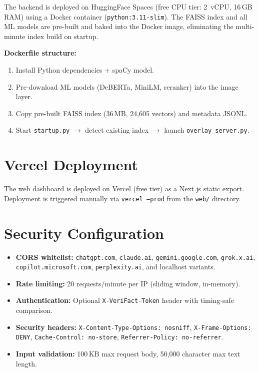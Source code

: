 \documentclass[12pt, a4paper, oneside]{report}
\begin{document}
The backend is deployed on HuggingFace Spaces (free CPU tier: 2~vCPU, 16\,GB RAM) using a Docker container (\texttt{python:3.11-slim}). The FAISS index and all ML models are pre-built and baked into the Docker image, eliminating the multi-minute index build on startup.

\textbf{Dockerfile structure:}
\begin{enumerate}[nosep]
    \item Install Python dependencies + spaCy model.
    \item Pre-download ML models (DeBERTa, MiniLM, reranker) into the image layer.
    \item Copy pre-built FAISS index (36\,MB, 24{,}605 vectors) and metadata JSONL.
    \item Start \texttt{startup.py} $\rightarrow$ detect existing index $\rightarrow$ launch \texttt{overlay\_server.py}.
\end{enumerate}

\section{Vercel Deployment}

The web dashboard is deployed on Vercel (free tier) as a Next.js static export. Deployment is triggered manually via \texttt{vercel --prod} from the \texttt{web/} directory.

\section{Security Configuration}

\begin{itemize}[nosep]
    \item \textbf{CORS whitelist:} \texttt{chatgpt.com}, \texttt{claude.ai}, \texttt{gemini.google.com}, \texttt{grok.x.ai}, \texttt{copilot.microsoft.com}, \texttt{perplexity.ai}, and localhost variants.
    \item \textbf{Rate limiting:} 20 requests/minute per IP (sliding window, in-memory).
    \item \textbf{Authentication:} Optional \texttt{X-VeriFact-Token} header with timing-safe comparison.
    \item \textbf{Security headers:} \texttt{X-Content-Type-Options: nosniff}, \texttt{X-Frame-Options: DENY}, \texttt{Cache-Control: no-store}, \texttt{Referrer-Policy: no-referrer}.
    \item \textbf{Input validation:} 100\,KB max request body, 50,000 character max text length.
\end{itemize}
\end{document}
